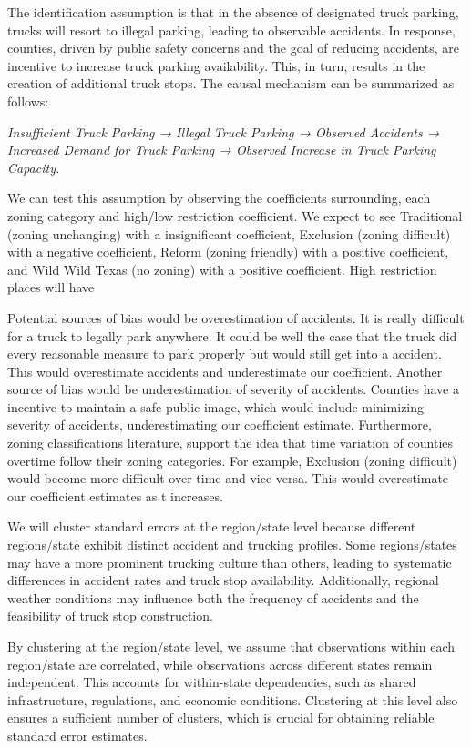 \documentclass[
  8pt,
  12pt]{article}
\begin{document}
The identification assumption is that in the absence of designated truck
parking, trucks will resort to illegal parking, leading to observable
accidents. In response, counties, driven by public safety concerns and
the goal of reducing accidents, are incentive to increase truck parking
availability. This, in turn, results in the creation of additional truck
stops. The causal mechanism can be summarized as follows:

\emph{Insufficient Truck Parking → Illegal Truck Parking → Observed
Accidents → Increased Demand for Truck Parking → Observed Increase in
Truck Parking Capacity.}

We can test this assumption by observing the coefficients surrounding,
each zoning category and high/low restriction coefficient. We expect to
see Traditional (zoning unchanging) with a insignificant coefficient,
Exclusion (zoning difficult) with a negative coefficient, Reform (zoning
friendly) with a positive coefficient, and Wild Wild Texas (no zoning)
with a positive coefficient. High restriction places will have

Potential sources of bias would be overestimation of accidents. It is
really difficult for a truck to legally park anywhere. It could be well
the case that the truck did every reasonable measure to park properly
but would still get into a accident. This would overestimate accidents
and underestimate our coefficient. Another source of bias would be
underestimation of severity of accidents. Counties have a incentive to
maintain a safe public image, which would include minimizing severity of
accidents, underestimating our coefficient estimate. Furthermore, zoning
classifications literature, support the idea that time variation of
counties overtime follow their zoning categories. For example, Exclusion
(zoning difficult) would become more difficult over time and vice
versa\citep{mclaughlinLandUseRegulation2012}. This would overestimate
our coefficient estimates as t increases.

We will cluster standard errors at the region/state level because
different regions/state exhibit distinct accident and trucking profiles.
Some regions/states may have a more prominent trucking culture than
others, leading to systematic differences in accident rates and truck
stop availability. Additionally, regional weather conditions may
influence both the frequency of accidents and the feasibility of truck
stop construction.

By clustering at the region/state level, we assume that observations
within each region/state are correlated, while observations across
different states remain independent. This accounts for within-state
dependencies, such as shared infrastructure, regulations, and economic
conditions. Clustering at this level also ensures a sufficient number of
clusters, which is crucial for obtaining reliable standard error
estimates.


  
\end{document}
